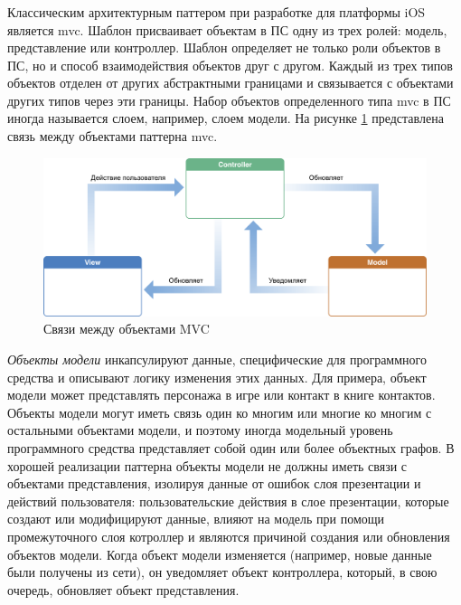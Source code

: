 \subsubsection {}
\label{sec:analysis:research:mobArch:mvc}

Классическим архитектурным паттером при разработке для платформы iOS является \gls{mvc}. Шаблон присваивает объектам в ПС одну из трех ролей: модель, представление или контроллер. Шаблон определяет не только роли объектов в ПС, но и способ взаимодействия объектов друг с другом. Каждый из трех типов объектов отделен от других абстрактными границами и связывается с объектами других типов через эти границы. Набор объектов определенного типа \gls{mvc} в ПС иногда называется слоем, например, слоем модели\cite{apple:mvc}. На рисунке \ref{sec:analysis:research:mobArch:apple-mvc:image:mvc} представлена связь между объектами паттерна \gls{mvc}.

\begin{figure}[h]
  \centering
    \includegraphics[width=1\textwidth]{inc/img/mvc.png}
  \caption{Связи между объектами MVC}
  \label{sec:analysis:research:mobArch:apple-mvc:image:mvc}
\end{figure}

\emph{Объекты модели} инкапсулируют данные, специфические для программного средства и описывают логику изменения этих данных. Для примера, объект модели может представлять персонажа в игре или контакт в книге контактов. Объекты модели могут иметь связь один ко многим или многие ко многим с остальными объектами модели, и поэтому иногда модельный уровень программного средства представляет собой один или более объектных графов. В хорошей реализации паттерна объекты модели не должны иметь связи с объектами представления, изолируя данные от ошибок слоя презентации и действий пользователя: пользовательские действия в слое презентации, которые создают или модифицируют данные, влияют на модель при помощи промежуточного слоя котроллер и являются причиной создания или обновления объектов модели. Когда объект модели изменяется (например, новые данные были получены из сети), он уведомляет объект контроллера, который, в свою очередь, обновляет объект представления.

